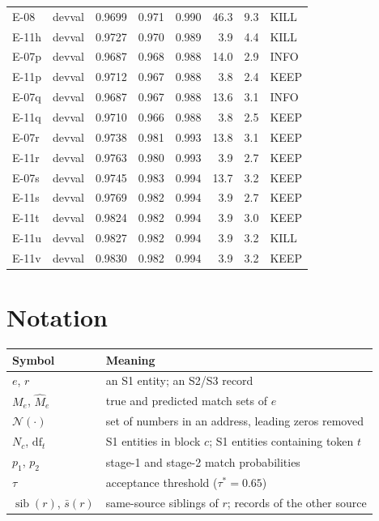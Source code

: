 \documentclass[10pt]{article}
\newcommand{\N}{\mathcal{N}}
\begin{document}
\begin{center}
\begin{tabular}{@{}llrrrrrl@{}}
E-08 & devval & 0.9699 & 0.971 & 0.990 & 46.3 & 9.3 & KILL \\
E-11h & devval & 0.9727 & 0.970 & 0.989 & 3.9 & 4.4 & KILL \\
E-07p & devval & 0.9687 & 0.968 & 0.988 & 14.0 & 2.9 & INFO \\
E-11p & devval & 0.9712 & 0.967 & 0.988 & 3.8 & 2.4 & KEEP \\
E-07q & devval & 0.9687 & 0.967 & 0.988 & 13.6 & 3.1 & INFO \\
E-11q & devval & 0.9710 & 0.966 & 0.988 & 3.8 & 2.5 & KEEP \\
E-07r & devval & 0.9738 & 0.981 & 0.993 & 13.8 & 3.1 & KEEP \\
E-11r & devval & 0.9763 & 0.980 & 0.993 & 3.9 & 2.7 & KEEP \\
E-07s & devval & 0.9745 & 0.983 & 0.994 & 13.7 & 3.2 & KEEP \\
E-11s & devval & 0.9769 & 0.982 & 0.994 & 3.9 & 2.7 & KEEP \\
E-11t & devval & 0.9824 & 0.982 & 0.994 & 3.9 & 3.0 & KEEP \\
E-11u & devval & 0.9827 & 0.982 & 0.994 & 3.9 & 3.2 & KILL \\
E-11v & devval & 0.9830 & 0.982 & 0.994 & 3.9 & 3.2 & KEEP \\
\bottomrule
\end{tabular}
\end{center}

\section{Notation}
\begin{center}\small
\begin{tabular}{@{}ll@{}}
\toprule
Symbol & Meaning \\
\midrule
$e$, $r$ & an S1 entity; an S2/S3 record \\
$M_e$, $\hat M_e$ & true and predicted match sets of $e$ \\
$\N(\cdot)$ & set of numbers in an address, leading zeros removed \\
$N_c$, $\mathrm{df}_t$ & S1 entities in block $c$; S1 entities containing token $t$ \\
$p_1$, $p_2$ & stage-1 and stage-2 match probabilities \\
$\tau$ & acceptance threshold ($\tau^* = 0.65$) \\
$\operatorname{sib}(r)$, $\bar s(r)$ & same-source siblings of $r$; records of the other source \\
\bottomrule
\end{tabular}
\end{center}
\end{document}
